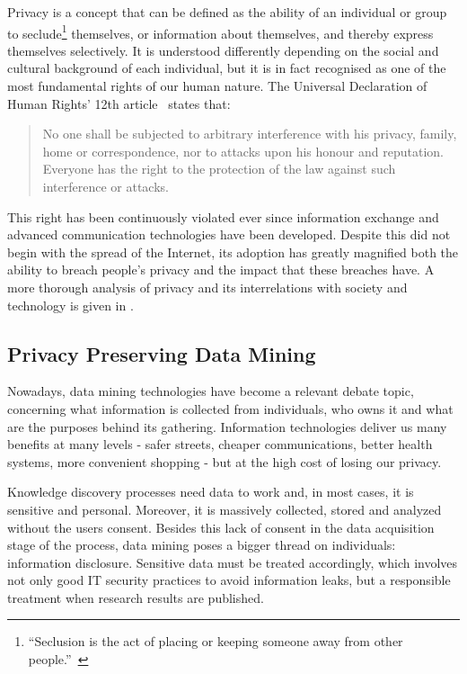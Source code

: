 Privacy is a concept that can be defined as the ability of an individual or group to
seclude\footnote{“Seclusion is the act of placing or keeping someone away from other people.”~\citep{web:Merriam:Seclusion}} themselves, or information about themselves, and
thereby express themselves selectively. It is understood differently depending on the social
and cultural background of each individual, but it is in fact recognised as one of the most
fundamental rights of our human nature. The Universal Declaration of Human Rights’ 12th
article~\citep{web:UN:HumanRightsDeclaration} states that:

\begin{quote}
	No one shall be subjected to arbitrary interference with his privacy, family, home or
	correspondence, nor to attacks upon his honour and reputation. Everyone has the right to
	the protection of the law against such interference or attacks.
\end{quote}

This right has been continuously violated ever since information exchange and advanced
communication technologies have been developed. Despite this did not begin with the spread
of the Internet, its adoption has greatly magnified both the ability to breach people’s privacy
and the impact that these breaches have. A more thorough analysis of privacy and its interrelations
with society and technology is given in .

\subsection{Privacy Preserving Data Mining}
\label{Introduction::Context::PPSM}

Nowadays, data mining technologies have become a relevant debate topic, concerning what
information is collected from individuals, who owns it and what are the purposes behind
its gathering. Information technologies deliver us many benefits at many levels - safer
streets, cheaper communications, better health systems, more convenient shopping - but
at the high cost of losing our privacy.

Knowledge discovery processes need data to work and, in most cases, it is sensitive and
personal. Moreover, it is massively collected, stored and analyzed without the users consent.
Besides this lack of consent in the data acquisition stage of the process,
data mining poses a bigger thread on individuals: information disclosure. Sensitive data
must be treated accordingly, which involves not only good IT security practices to avoid
information leaks, but a responsible treatment when research results are published.

